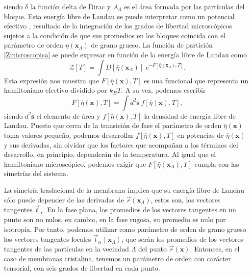 siendo $\delta$ la función delta de Dirac y $A_{\Lambda}$ es el área
formada por las partículas del bloque. Esta energía libre de Landau se puede
interpretar como un potencial efectivo \cite{Heller:Method}, resultado de la integración de los
grados de libertad microscópicos sujetos a la condición de que sus promedios
en los  bloques coincida con el parámetro de orden
$\eta(\mathbf{x}_{\Lambda})$ de grano grueso. La función de partición
\eqref{Zmicroscopica} se puede expresar en función de la energía libre de
Landau como
\begin{equation*}
\mathcal{Z}[T]=\int D[\bar{\eta}(\mathbf{x}_{\Lambda})]\; e^{-F[\bar{\eta}(\mathbf{x}_{\Lambda}),T]}.
\end{equation*}
Esta expresión nos muestra que $F[\bar{\eta}(\mathbf{x}),T]$ es una funcional
que representa un hamiltoniano efectivo dividido por $k_BT$. A su vez, podemos
escribir 
\begin{equation*}
F[\bar{\eta}(\mathbf{x}),T]=\int\! d^2\mathbf{s}\ f[\bar{\eta}(\mathbf{x}),T],
\end{equation*}
siendo $d^2\mathbf{s}$ el elemento de área y $f[\bar{\eta}(\mathbf{x}),T]$ la
densidad de energía libre de Landau. Puesto que cerca de la transición de fase
el parámetro de orden $\bar{\eta}(\mathbf{x})$ toma valores pequeño, podemos
desarrollar $f[\bar{\eta}(\mathbf{x}),T]$ en potencias de
$\bar{\eta}(\mathbf{x})$ y sus derivadas, sin olvidar que los factores que
acompañan a los términos del desarrollo, en principio, dependerán de la
temperatura. Al igual que el hamiltoniano microscópico, podemos exigir que
$F[\bar{\eta}(\mathbf{x}_{\Lambda}),T]$ cumpla con las simetrías del sistema.

La simetría traslacional de la membrana implica que su energía libre de Landau
sólo puede depender de las derivadas de $\vec{r}(\mathbf{x}_{\Lambda})$, estos
son, los vectores tangentes $\vec{t}_{\alpha}$. En la fase
plana, los promedios de los vectores tangentes en un punto son no nulos, en
cambio, en la fase rugosa, su promedio es nulo por isotropía. Por tanto,
podemos utilizar como  parámetro de orden de grano grueso los vectores
tangentes locales $\vec{t}_{\alpha}(\mathbf{x}_{\Lambda})$, que serán
los promedios de los vectores tangentes de las partículas en la vecindad
$\Lambda$ del punto $\vec{r}(\mathbf{x})$. Entonces, en el caso de
membranas cristalina, tenemos un parámetro de orden con carácter tensorial,
con seis grados de libertad en cada punto.

